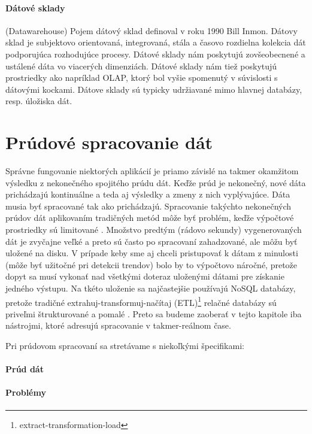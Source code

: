 \paragraph{Dátové sklady} (Datawarehouse)
Pojem dátový sklad definoval v roku 1990 Bill Inmon. Dátovy sklad je subjektovo orientovaná, integrovaná, stála a časovo rozdielna kolekcia dát podporujúca rozhodujúce procesy\citep{chaudhuri1997overview}. Dátové sklady nám poskytujú zovšeobecnené a ustálené dáta vo viacerých dimenziách. Dátové sklady nám tiež poskytujú prostriedky ako napríklad OLAP, ktorý bol vyšie spomenutý v súvislosti s dátovými kockami. Dátove sklady sú typicky udržiavané mimo hlavnej databázy, resp. úložiska dát. 





\section{Prúdové spracovanie dát}
Správne fungovanie niektorých aplikácií je priamo závislé na takmer okamžitom výsledku z nekonečného spojitého prúdu dát. Keďže prúd je nekonečný, nové dáta prichádzajú kontinuálne a teda aj výsledky a zmeny z nich vyplývajúce. Dáta musia byť spracované tak ako prichádzajú. Spracovanie takýchto nekonečných prúdov dát aplikovaním tradičných metód môže byť problém, keďže výpočtové prostriedky sú limitované \citep{babcock2002models}. Množstvo predtým (rádovo sekundy) vygenerovaných dát je zvyčajne veľké a preto sú často po spracovaní zahadzované, ale môžu byť uložené na disku. V prípade keby sme aj chceli pristupovať k dátam z minulosti (môže byť užitočné pri detekcii trendov) bolo by to výpočtovo náročné, pretože dopyt sa musí vykonať nad všetkými doteraz uloženými dátami pre získanie jedného výstupu\citep{silvestri2006distributed}. Na tkéto uloženie sa najčastejšie používajú NoSQL databázy, pretože tradičné extrahuj-transformuj-načítaj (ETL)\footnote{extract-transformation-load} relačné databázy sú priveľmi štrukturované a pomalé \citep{liu2014survey}. Preto sa budeme zaoberať v tejto kapitole iba nástrojmi, ktoré adresujú spracovanie v takmer-reálnom čase.
\par
Pri prúdovom spracovaní sa stretávame s niekoľkými špecifikami:


\paragraph{Prúd dát}

\paragraph{Problémy}


































